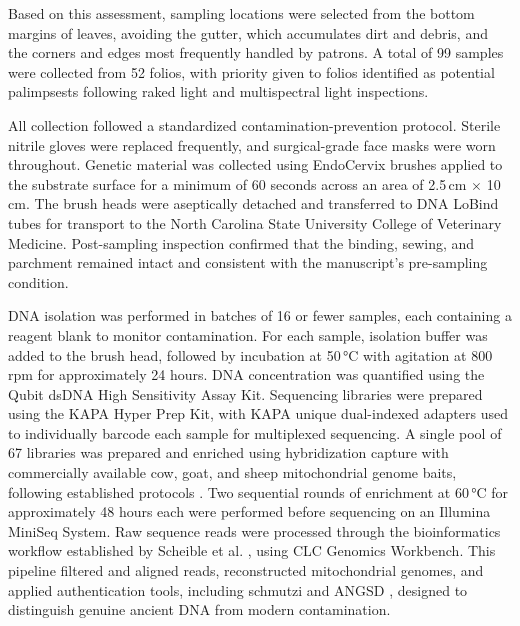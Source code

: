 \documentclass[final]{anthology-ch} %
\begin{document}
Based on this assessment, sampling locations were selected from the bottom margins of leaves, avoiding the gutter, which accumulates dirt and debris, and the corners and edges most frequently handled by patrons. A total of 99 samples were collected from 52 folios, with priority given to folios identified as potential palimpsests following raked light and multispectral light inspections.

All collection followed a standardized contamination-prevention protocol. Sterile nitrile gloves were replaced frequently, and surgical-grade face masks were worn throughout. Genetic material was collected using EndoCervix brushes applied to the substrate surface for a minimum of 60 seconds across an area of 2.5\,cm $\times$ 10\,cm. The brush heads were aseptically detached and transferred to DNA LoBind tubes for transport to the North Carolina State University College of Veterinary Medicine. Post-sampling inspection confirmed that the binding, sewing, and parchment remained intact and consistent with the manuscript's pre-sampling condition.

DNA isolation was performed in batches of 16 or fewer samples, each containing a reagent blank to monitor contamination. For each sample, isolation buffer was added to the brush head, followed by incubation at 50\,°C with agitation at 800\,rpm for approximately 24 hours. DNA concentration was quantified using the Qubit dsDNA High Sensitivity Assay Kit. Sequencing libraries were prepared using the KAPA Hyper Prep Kit, with KAPA unique dual-indexed adapters used to individually barcode each sample for multiplexed sequencing. A single pool of 67 libraries was prepared and enriched using hybridization capture with commercially available cow, goat, and sheep mitochondrial genome baits, following established protocols \cite{scheible2024development}. Two sequential rounds of enrichment at 60\,°C for approximately 48 hours each were performed before sequencing on an Illumina MiniSeq System. Raw sequence reads were processed through the bioinformatics workflow established by Scheible et al. \cite{scheible2024development}, using CLC Genomics Workbench. This pipeline filtered and aligned reads, reconstructed mitochondrial genomes, and applied authentication tools, including schmutzi \cite{renaud2015schmutzi} and ANGSD \cite{korneliussen2014angsd}, designed to distinguish genuine ancient DNA from modern contamination.
\end{document}
